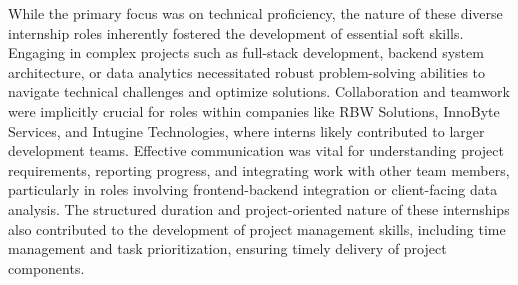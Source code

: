 \documentclass[11pt,a4paper]{article}
\newenvironment{card}{
    \begin{tcolorbox}[
        enhanced,
        colback=cardback,
        colframe=border,
        sharp corners,
        boxrule=0.5pt,
        drop shadow,
        drop shadow={shadow xshift=1mm,shadow yshift=-1mm,fill=border!50},
        boxsep=3mm,
        left=5mm, right=5mm, top=5mm, bottom=5mm,
        width=\textwidth,
        nobeforeafter
    ]
}{\end{tcolorbox}}
\begin{document}
\begin{card}
    While the primary focus was on technical proficiency, the nature of these diverse internship roles inherently fostered the development of essential soft skills. Engaging in complex projects such as full-stack development, backend system architecture, or data analytics necessitated robust problem-solving abilities to navigate technical challenges and optimize solutions. Collaboration and teamwork were implicitly crucial for roles within companies like RBW Solutions, InnoByte Services, and Intugine Technologies, where interns likely contributed to larger development teams. Effective communication was vital for understanding project requirements, reporting progress, and integrating work with other team members, particularly in roles involving frontend-backend integration or client-facing data analysis. The structured duration and project-oriented nature of these internships also contributed to the development of project management skills, including time management and task prioritization, ensuring timely delivery of project components.
\end{card}

\vspace{0.5cm}
\end{document}
